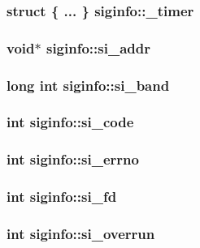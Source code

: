 \subsubsection[{\_\-timer}]{\setlength{\rightskip}{0pt plus 5cm}struct \{ ... \}   {\bf siginfo::\_\-timer}}\label{structsiginfo_ab7e85eb7702c6e6db6c366999d59f986}
\subsubsection[{si\_\-addr}]{\setlength{\rightskip}{0pt plus 5cm}void$\ast$ {\bf siginfo::si\_\-addr}}\label{structsiginfo_aa9babf5ab1dcfa795cd056bc2f294cab}
\subsubsection[{si\_\-band}]{\setlength{\rightskip}{0pt plus 5cm}long int {\bf siginfo::si\_\-band}}\label{structsiginfo_ad65aeab629d5c5cee65eec42126a129c}
\subsubsection[{si\_\-code}]{\setlength{\rightskip}{0pt plus 5cm}int {\bf siginfo::si\_\-code}}\label{structsiginfo_ab1b78958b8876452628ee5efe78538a2}
\subsubsection[{si\_\-errno}]{\setlength{\rightskip}{0pt plus 5cm}int {\bf siginfo::si\_\-errno}}\label{structsiginfo_abf9dec8158a137583e984dca217e773c}
\subsubsection[{si\_\-fd}]{\setlength{\rightskip}{0pt plus 5cm}int {\bf siginfo::si\_\-fd}}\label{structsiginfo_ab566047c68eef8146fa12c6c89507fba}
\subsubsection[{si\_\-overrun}]{\setlength{\rightskip}{0pt plus 5cm}int {\bf siginfo::si\_\-overrun}}\label{structsiginfo_a5ea3ed790ec78135ea10d283757eb2a5}
